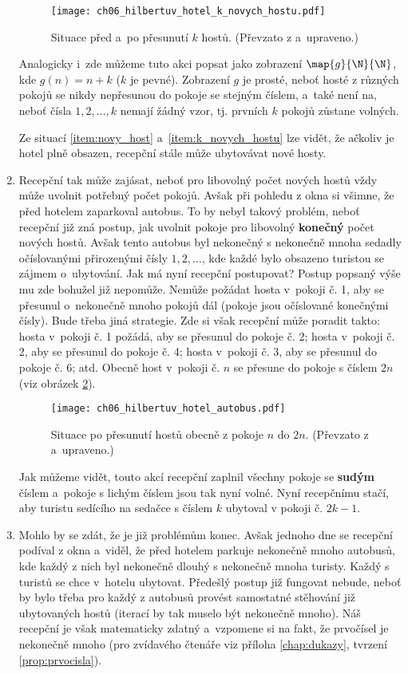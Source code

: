 \begin{enumerate}[label=\textit{(\roman*)}]
    \begin{figure}[h]
        \centering
        \texttt{[image: ch06\_hilbertuv\_hotel\_k\_novych\_hostu.pdf]}
        \caption{Situace před a~po přesunutí $k$ hostů. (Převzato z \cite{Rmoutil2022} a~upraveno.)}
        \label{fig:hilbertuv_hotel_k_novych_hostu}
    \end{figure}
    Analogicky i~zde můžeme tuto akci popsat jako zobrazení $\map{g}{\N}{\N}$, kde $g(n)=n+k$ ($k$ je pevné). Zobrazení $g$ je prosté, neboť hosté z různých pokojů se nikdy nepřesunou do pokoje se stejným číslem, a~také není na, neboť čísla $1,2,\dots,k$ nemají žádný vzor, tj. prvních $k$ pokojů zůstane volných.\par
    Ze situací \ref{item:novy_host} a~\ref{item:k_novych_hostu} lze vidět, že ačkoliv je hotel plně obsazen, recepční stále může ubytovávat nové hosty.
    \item Recepční tak může zajásat, neboť pro libovolný počet nových hostů vždy může uvolnit potřebný počet pokojů. Avšak při pohledu z okna si všimne, že před hotelem zaparkoval autobus. To by nebyl takový problém, neboť recepční již zná postup, jak uvolnit pokoje pro libovolný \textbf{konečný} počet nových hostů. Avšak tento autobus byl nekonečný s nekonečně mnoha sedadly očíslovanými přirozenými čísly $1,2,\dots$, kde každé bylo obsazeno turistou se zájmem o~ubytování. Jak má nyní recepční postupovat? Postup popsaný výše mu zde bohužel již nepomůže. Nemůže požádat hosta v~pokoji č. 1, aby se přesunul o~nekonečně mnoho pokojů dál (pokoje jsou očíslované konečnými čísly). Bude třeba jiná strategie. Zde si však recepční může poradit takto: hosta v~pokoji č. 1 požádá, aby se přesunul do pokoje č. 2; hosta v~pokoji č. 2, aby se přesunul do pokoje č. 4; hosta v~pokoji č. 3, aby se přesunul do pokoje č. 6; atd. Obecně host v~pokoji č. $n$ se přesune do pokoje s číslem $2n$ (viz obrázek \ref{fig:hilbertuv_hotel_autobus}).
    \begin{figure}[h]
        \centering
        \texttt{[image: ch06\_hilbertuv\_hotel\_autobus.pdf]}
        \caption{Situace po přesunutí hostů obecně z pokoje $n$ do $2n$. (Převzato z \cite{Rmoutil2022} a~upraveno.)}
        \label{fig:hilbertuv_hotel_autobus}
    \end{figure}
    Jak můžeme vidět, touto akcí recepční zaplnil všechny pokoje se \textbf{sudým} číslem a~pokoje s lichým číslem jsou tak nyní volné. Nyní recepčnímu stačí, aby turistu sedícího na sedačce s číslem $k$ ubytoval v pokoji č. $2k-1$.
    \item Mohlo by se zdát, že je již problémům konec. Avšak jednoho dne se recepční podíval z okna a~viděl, že před hotelem parkuje nekonečně mnoho autobusů, kde každý z nich byl nekonečně dlouhý s nekonečně mnoha turisty. Každý s turistů se chce v~hotelu ubytovat. Předešlý postup již fungovat nebude, neboť by bylo třeba pro každý z autobusů provést samostatné stěhování již ubytovaných hostů (iterací by tak muselo být nekonečně mnoho). Náš recepční je však matematicky zdatný a~vzpomene si na fakt, že prvočísel je nekonečně mnoho (pro zvídavého čtenáře viz příloha \ref{chap:dukazy}, tvrzení \ref{prop:prvocisla}).

\end{enumerate}
